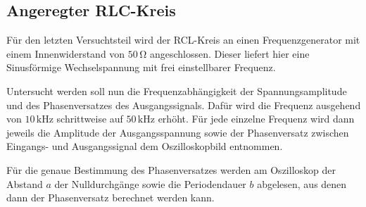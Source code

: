 \subsection{Angeregter RLC-Kreis}
\label{sec:Angeregter RLC-Kreis}

Für den letzten Versuchtsteil wird der RCL-Kreis an einen Frequenzgenerator mit einem Innenwiderstand von $50\,\unit{\ohm}$ angeschlossen.
Dieser liefert hier eine Sinusförmige Wechselspannung mit frei einstellbarer Frequenz.

Untersucht werden soll nun die Frequenzabhängigkeit der Spannungsamplitude und des Phasenversatzes des Ausgangssignals.
Dafür wird die Frequenz ausgehend von $10\,\unit{\kilo\hertz}$ schrittweise auf $50\,\unit{\kilo\hertz}$ erhöht.
Für jede einzelne Frequenz wird dann jeweils die Amplitude der Ausgangsspannung sowie der Phasenversatz zwischen Eingangs-
und Ausgangssignal dem Oszilloskopbild entnommen.

Für die genaue Bestimmung des Phasenversatzes werden am Oszilloskop der Abstand $a$ der Nulldurchgänge sowie die Periodendauer $b$
abgelesen, aus denen dann der Phasenversatz berechnet werden kann.